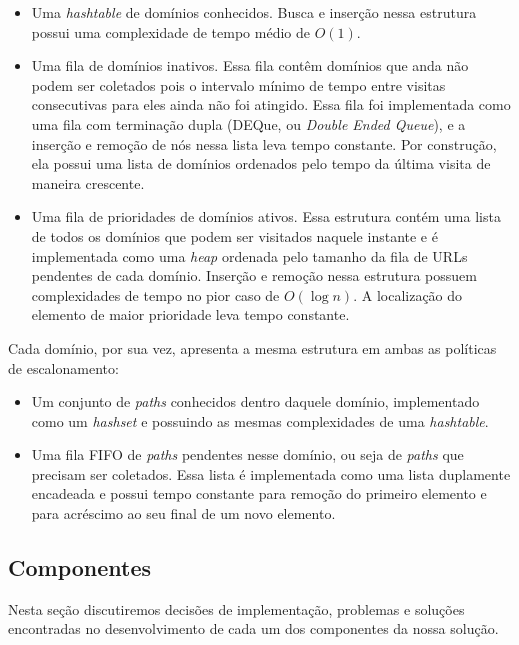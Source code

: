 \documentclass[10pt,twocolumn]{article}
\begin{document}
\begin{itemize}

\item Uma \emph{hashtable} de domínios conhecidos. Busca e inserção
nessa estrutura possui uma complexidade de tempo médio de \(O\left(1 
\right)\).

\item Uma fila de domínios inativos. Essa fila contêm domínios que
anda não podem ser coletados pois o intervalo mínimo de tempo entre
visitas consecutivas para eles ainda não foi atingido. Essa fila foi
implementada como uma fila com terminação dupla (DEQue, ou \emph{Double
Ended Queue}), e a inserção e remoção de nós nessa lista leva tempo
constante. Por construção, ela possui uma lista de domínios ordenados
pelo tempo da última visita de maneira crescente.

\item Uma fila de prioridades de domínios ativos. Essa estrutura contém
uma lista de todos os domínios que podem ser visitados naquele instante
e é implementada como uma \emph{heap} ordenada pelo tamanho da fila de
URLs pendentes de cada domínio. Inserção e remoção nessa estrutura
possuem complexidades de tempo no pior caso de \(O\left(\log n\right)\).
A localização do elemento de maior prioridade leva tempo constante.

\end{itemize}


Cada domínio, por sua vez, apresenta a mesma estrutura em ambas as
políticas de escalonamento:
\begin{itemize}
\item Um conjunto de \emph{paths} conhecidos dentro daquele domínio,
implementado como um \emph{hashset} e possuindo as mesmas complexidades
de uma \emph{hashtable}.
\item Uma fila FIFO de \emph{paths} pendentes nesse domínio, ou seja de
\emph{paths} que precisam ser coletados. Essa lista é implementada como
uma lista duplamente encadeada e possui tempo constante para remoção do
primeiro elemento e para acréscimo ao seu final de um novo elemento.
\end{itemize}


\subsection{Componentes}

Nesta seção discutiremos decisões de implementação, problemas e soluções
encontradas no desenvolvimento de cada um dos componentes da nossa
solução.
\end{document}
